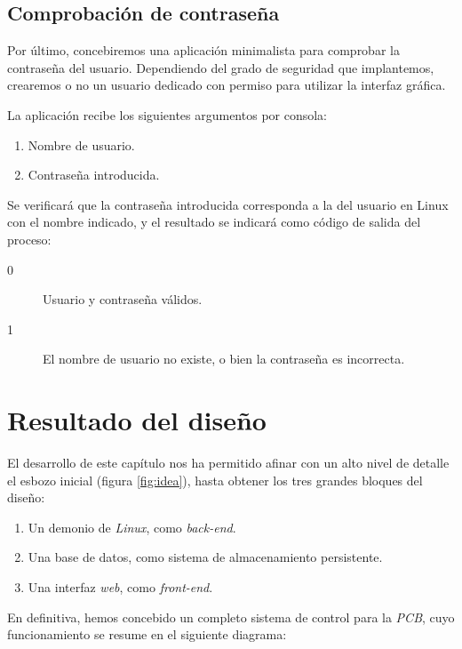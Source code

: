 \smallskip

\subsection{Comprobación de contraseña}
\label{subsec:applogin}

Por último, concebiremos una aplicación minimalista para comprobar la contraseña del usuario. Dependiendo del grado de seguridad que implantemos, crearemos o no un usuario dedicado con permiso para utilizar la interfaz gráfica.

La aplicación recibe los siguientes argumentos por consola:

\begin{enumerate}
	\item Nombre de usuario.
	\item Contraseña introducida.
\end{enumerate}

Se verificará que la contraseña introducida corresponda a la del usuario en Linux con el nombre indicado, y el resultado se indicará como código de salida del proceso:

\begin{description}
	\item[0] Usuario y contraseña válidos.
	\item[1] El nombre de usuario no existe, o bien la contraseña es incorrecta.
\end{description}

\section{Resultado del diseño}

El desarrollo de este capítulo nos ha permitido afinar con un alto nivel de detalle el esbozo inicial (figura \ref{fig:idea}), hasta obtener los tres grandes bloques del diseño:

\begin{enumerate}
	\item Un demonio de \textit{Linux}, como \textit{back-end}.
	\item Una base de datos, como sistema de almacenamiento persistente.
	\item Una interfaz \textit{web}, como \textit{front-end}.
\end{enumerate}

En definitiva, hemos concebido un completo sistema de control para la \textit{PCB}, cuyo funcionamiento se resume en el siguiente diagrama:

